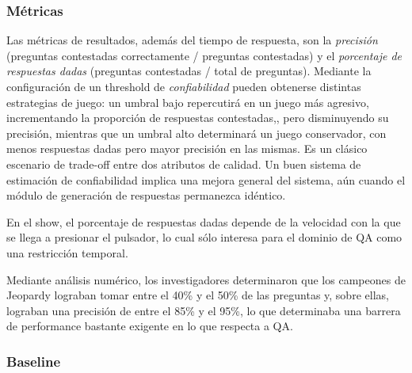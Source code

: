 \subsubsection*{Métricas}

Las métricas de resultados, además del tiempo de respuesta, son la
\textit{precisión} (preguntas contestadas correctamente / preguntas
contestadas) y el \textit{porcentaje de respuestas dadas }(preguntas
contestadas / total de preguntas). Mediante la configuración de un
threshold de \textit{confiabilidad} pueden obtenerse distintas
estrategias de juego: un umbral bajo repercutirá en un juego más
agresivo, incrementando la proporción de respuestas contestadas,,
pero disminuyendo su precisión, mientras que un umbral alto
determinará un juego conservador, con menos respuestas dadas pero
mayor precisión en las mismas. Es un clásico escenario de trade-off
entre dos atributos de calidad. Un buen sistema de estimación de
confiabilidad implica una mejora general del sistema, aún cuando el
módulo de generación de respuestas permanezca idéntico.


\bigskip

En el show, el porcentaje de respuestas dadas depende de la velocidad
con la que se llega a presionar el pulsador, lo cual sólo interesa
para el dominio de QA como una restricción temporal. 


\bigskip

Mediante análisis numérico, los investigadores determinaron que los
campeones de Jeopardy lograban tomar entre el 40\% y el 50\% de las
preguntas y, sobre ellas, lograban una precisión de entre el 85\% y
el 95\%, lo que determinaba una barrera de performance bastante
exigente en lo que respecta a QA.


\bigskip

\subsubsection*{Baseline}

